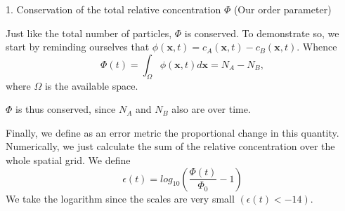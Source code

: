 \documentclass{article}
\begin{document}
1. Conservation of the total relative concentration $\Phi$ (Our order parameter)

Just like the total number of particles, $\Phi$ is conserved.
To demonstrate so, we start by reminding ourselves that $\phi(\mathbf{x},t) = c_A(\mathbf{x},t)-c_B(\mathbf{x},t)$.
Whence \[ \Phi(t) = \int_{\Omega} \phi(\mathbf{x},t)d\mathbf{x} = N_A - N_B, \]
where $\Omega$ is the available space.

$\Phi$ is thus conserved, since $N_A$ and $N_B$ also are over time.

Finally, we define as an error metric the proportional change in this quantity.
Numerically, we just calculate the sum of the relative concentration over the whole spatial grid.
We define
\[ \epsilon(t) = log_{10}(\frac{\Phi(t)}{\Phi_0}-1) \]
We take the logarithm since the scales are very small $(\epsilon(t)<-14)$.
\end{document}
